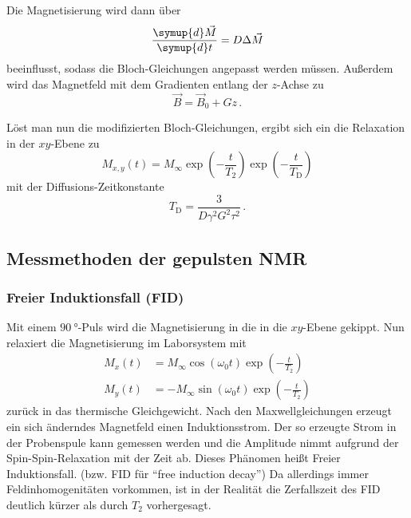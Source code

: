 Die Magnetisierung wird dann über
\begin{equation}
    \frac{\symup{d} \vec{M}}{\symup{d} t} = D \Delta \vec{M}
\end{equation}
beeinflusst, sodass die Bloch-Gleichungen angepasst werden müssen.
Außerdem wird das Magnetfeld mit dem Gradienten entlang der $z$-Achse zu
\begin{equation}
    \vec{B} = \vec{B}_0 + G z \, .
\end{equation}

Löst man nun die modifizierten Bloch-Gleichungen, ergibt sich ein die Relaxation in der $xy$-Ebene zu
\begin{equation}
    M_{x,y}(t) = M_\infty \exp\left( -\frac{t}{T_2} \right) \exp\left( -\frac{t}{T_\text{D}} \right)
    \label{eq:TD_relaxation}
\end{equation}
mit der Diffusions-Zeitkonstante
\begin{equation}
    T_\text{D} = \frac{3}{D \gamma^2 G^2 \tau^2} \, .
    \label{eq:TD}
\end{equation}


%

\subsection{Messmethoden der gepulsten NMR}
\label{ssec:Messmethoden}

\subsubsection{Freier Induktionsfall (FID)}
\label{sssec:FID}

Mit einem $\SI{90}{\degree}$-Puls wird die Magnetisierung in die in die $xy$-Ebene gekippt.
Nun relaxiert die Magnetisierung im Laborsystem mit 
\begin{align}
    M_x(t) &= M_\infty \cos(\omega_0 t) \exp\left( -\frac{t}{T_2} \right) \\
    M_y(t) &= -M_\infty \sin(\omega_0 t) \exp\left( -\frac{t}{T_2} \right)
\end{align}
zurück in das thermische Gleichgewicht.
Nach den Maxwellgleichungen erzeugt ein sich änderndes Magnetfeld einen Induktionsstrom.
Der so erzeugte Strom in der Probenspule kann gemessen werden und die Amplitude nimmt aufgrund der Spin-Spin-Relaxation mit der Zeit ab.
Dieses Phänomen heißt Freier Induktionsfall. (bzw. FID für \enquote{free induction decay})
Da allerdings immer Feldinhomogenitäten vorkommen, ist in der Realität die Zerfallszeit des FID deutlich kürzer als durch $T_2$ vorhergesagt.

